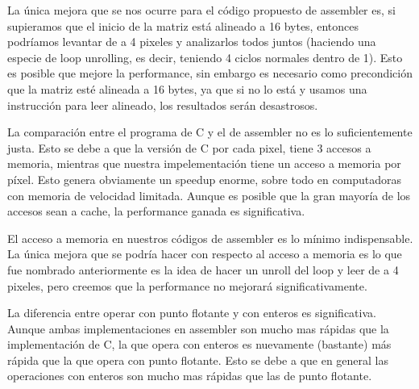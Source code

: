 La única mejora que se nos ocurre para el código propuesto de assembler es, si supieramos que el inicio de la matriz está alineado a 16 bytes, entonces podríamos levantar de a 4 pixeles y analizarlos todos juntos (haciendo una especie de loop unrolling, es decir, teniendo 4 ciclos normales dentro de 1).
Esto es posible que mejore la performance, sin embargo es necesario como precondición que la matriz esté alineada a 16 bytes, ya que si no lo está y usamos una instrucción para leer alineado, los resultados serán desastrosos.

La comparación entre el programa de C y el de assembler no es lo suficientemente justa. Esto se debe a que la versión de C por cada pixel, tiene 3 accesos a memoria, mientras que nuestra impelementación tiene un acceso a memoria por píxel. Esto genera obviamente un speedup enorme, sobre todo en computadoras con memoria de velocidad limitada.
Aunque es posible que la gran mayoría de los accesos sean a cache, la performance ganada es significativa.

El acceso a memoria en nuestros códigos de assembler es lo mínimo indispensable. La única mejora que se podría hacer con respecto al acceso a memoria es lo que fue nombrado anteriormente es la idea de hacer un unroll del loop y leer de a 4 pixeles, pero creemos que la performance no mejorará significativamente.

La diferencia entre operar con punto flotante y con enteros es significativa. Aunque ambas implementaciones en assembler son mucho mas rápidas que la implementación de C, la que opera con enteros es nuevamente (bastante) más rápida que la que opera con punto flotante. Esto se debe a que en general las operaciones con enteros son mucho mas rápidas que las de punto flotante.







